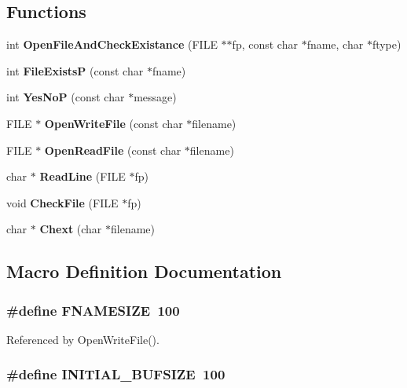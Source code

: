 \subsection*{Functions}
\begin{DoxyCompactItemize}
\item 
int {\bf Open\-File\-And\-Check\-Existance} (F\-I\-L\-E $\ast$$\ast$fp, const char $\ast$fname, char $\ast$ftype)
\item 
int {\bf File\-Exists\-P} (const char $\ast$fname)
\item 
int {\bf Yes\-No\-P} (const char $\ast$message)
\item 
F\-I\-L\-E $\ast$ {\bf Open\-Write\-File} (const char $\ast$filename)
\item 
F\-I\-L\-E $\ast$ {\bf Open\-Read\-File} (const char $\ast$filename)
\item 
char $\ast$ {\bf Read\-Line} (F\-I\-L\-E $\ast$fp)
\item 
void {\bf Check\-File} (F\-I\-L\-E $\ast$fp)
\item 
char $\ast$ {\bf Chext} (char $\ast$filename)
\end{DoxyCompactItemize}


\subsection{Macro Definition Documentation}
\subsubsection[{F\-N\-A\-M\-E\-S\-I\-Z\-E}]{\setlength{\rightskip}{0pt plus 5cm}\#define F\-N\-A\-M\-E\-S\-I\-Z\-E~100}\label{output_8cpp_ae83ce735482c1d710ee7664331f71875}


Referenced by Open\-Write\-File().

\subsubsection[{I\-N\-I\-T\-I\-A\-L\-\_\-\-B\-U\-F\-S\-I\-Z\-E}]{\setlength{\rightskip}{0pt plus 5cm}\#define I\-N\-I\-T\-I\-A\-L\-\_\-\-B\-U\-F\-S\-I\-Z\-E~100}\label{output_8cpp_afa6724360f3351cdc337471d90c7d7b1}


